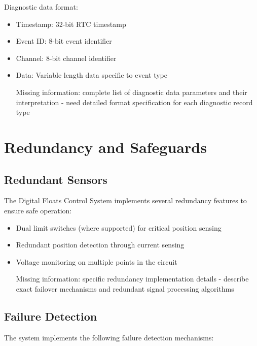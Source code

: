 \documentclass[12pt,a4paper,twoside,openright]{book}
\begin{document}
Diagnostic data format:
\begin{itemize}
    \item Timestamp: 32-bit RTC timestamp
    \item Event ID: 8-bit event identifier
    \item Channel: 8-bit channel identifier
    \item Data: Variable length data specific to event type
    \item [Missing information: complete list of diagnostic data parameters and their interpretation - need detailed format specification for each diagnostic record type]
\end{itemize}

\section{Redundancy and Safeguards}

\subsection{Redundant Sensors}

The Digital Floats Control System implements several redundancy features to ensure safe operation:

\begin{itemize}
    \item Dual limit switches (where supported) for critical position sensing
    \item Redundant position detection through current sensing
    \item Voltage monitoring on multiple points in the circuit
    \item [Missing information: specific redundancy implementation details - describe exact failover mechanisms and redundant signal processing algorithms]
\end{itemize}

\subsection{Failure Detection}

The system implements the following failure detection mechanisms:
\end{document}
